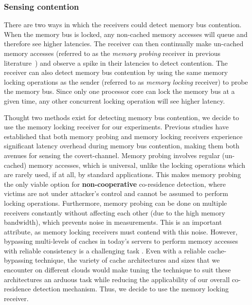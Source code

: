 \subsubsection{Sensing contention} 
There are two ways in which the receivers could detect memory bus contention.
When the memory bus is locked, any non-cached memory accesses will queue and
therefore see higher latencies. The receiver can then continually make un-cached
memory accesses (referred to as the \textit{memory probing} receiver in previous
literature~\cite{varadarajan2015}) and observe a spike in their latencies to
detect contention.  The receiver can also detect memory bus contention by using
the same memory locking operations as the sender (referred to as \textit{memory
locking} receiver) to probe the memory bus. Since only one processor core can
lock the memory bus at a given time, any other concurrent locking operation will
see higher latency. 

Thought two methods exist for detecting memory bus contention, we decide to use
the memory locking receiver for our experiments. Previous
studies\cite{wuusenix2012,varadarajan2015} have established that both memory
probing and memory locking receivers experience significant latency overhead
during memory bus contention, making them both avenues for sensing the
covert-channel. Memory probing involves regular (un-cached) memory accesses,
which is universal, unlike the locking operations which are rarely used, if at
all, by standard applications. This makes memory probing the only viable option
for \textbf{non-cooperative} co-residence detection, where victims are not under
attacker's control and cannot be assumed to perform locking operations.
Furthermore, memory probing can be done on multiple receivers constantly without
affecting each other (due to the high memory bandwidth), which prevents noise in
measurements.  This is an important attribute, as memory locking receivers must
contend with this noise. However, bypassing multi-levels of caches in today's
servers to perform memory accesses with reliable consistency is a challenging
task . Even with a reliable cache-bypassing technique,
the variety of cache architectures and sizes that we encounter on different
clouds would make tuning the technique to suit these architectures an arduous
task while reducing the applicability of our overall co-residence detection
mechanism.  Thus, we decide to use the memory locking receiver.


